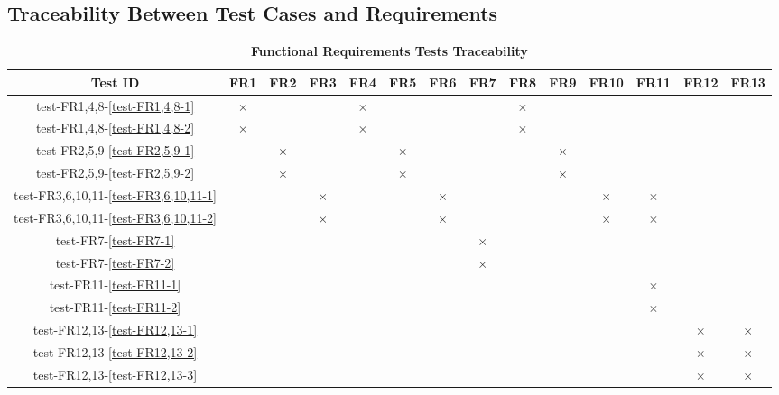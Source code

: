 \documentclass[12pt, titlepage]{article}
\begin{document}
\newpage


\begin{landscape}
\subsection{Traceability Between Test Cases and Requirements} \label{section:4.4}

\begin{table}[H]
  \centering
  \begin{tabular}{|c|c|c|c|c|c|c|c|c|c|c|c|c|c|}
  \hline
   Test ID & FR1 & FR2 & FR3 & FR4 & FR5 & FR6 & FR7 & FR8 & FR9 & FR10 & FR11 & FR12 & FR13\\
  \hline
  test-FR1,4,8-\ref{test-FR1,4,8-1} & $\times$ & & & $\times$ & & & & $\times$ & & & & & \\
  \hline
  test-FR1,4,8-\ref{test-FR1,4,8-2} & $\times$ & & & $\times$ & & & & $\times$ & & & & & \\
  \hline
  test-FR2,5,9-\ref{test-FR2,5,9-1} & & $\times$ & & & $\times$ & & & & $\times$ & & & & \\
  \hline
  test-FR2,5,9-\ref{test-FR2,5,9-2} & & $\times$ & & & $\times$ & & & & $\times$ & & & & \\
  \hline
  test-FR3,6,10,11-\ref{test-FR3,6,10,11-1} & & & $\times$ & & & $\times$ & & & & $\times$ & $\times$ & & \\
  \hline
  test-FR3,6,10,11-\ref{test-FR3,6,10,11-2} & & & $\times$ & & & $\times$ & & & & $\times$ & $\times$ & & \\
  \hline
  test-FR7-\ref{test-FR7-1} & & & & & & & $\times$ & & & & & & \\
  \hline
  test-FR7-\ref{test-FR7-2} & & & & & & & $\times$ & & & & & & \\
  \hline
  test-FR11-\ref{test-FR11-1} & & & & & & & & & & & $\times$ & & \\
  \hline
  test-FR11-\ref{test-FR11-2} & & & & & & & & & & & $\times$ & & \\
  \hline
  test-FR12,13-\ref{test-FR12,13-1} & & & & & & & & & & & & $\times$ & $\times$ \\
  \hline
  test-FR12,13-\ref{test-FR12,13-2} & & & & & & & & & & & & $\times$ & $\times$ \\
  \hline
  test-FR12,13-\ref{test-FR12,13-3} & & & & & & & & & & & & $\times$ & $\times$ \\
  \hline
\end{tabular}
\caption{\bf Functional Requirements Tests Traceability} \label{tab:fr-test-traceability}
\end{table}



\end{landscape}
\end{document}
